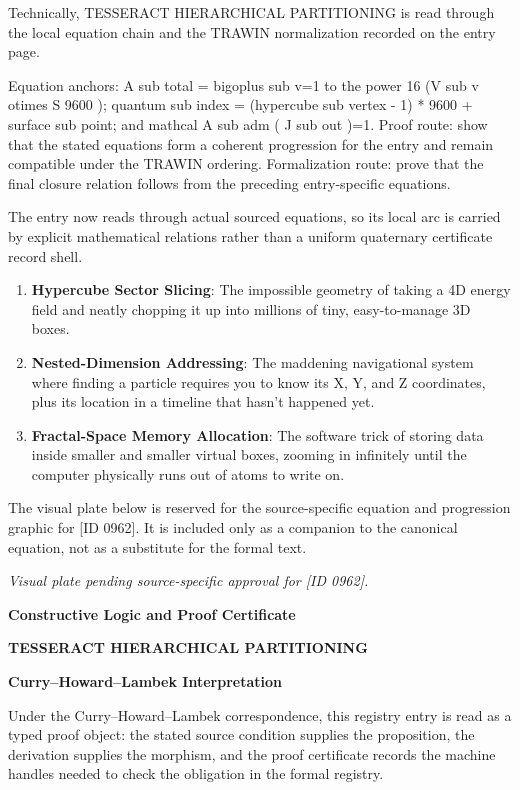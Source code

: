 Technically, TESSERACT HIERARCHICAL PARTITIONING is read through the local equation chain and the TRAWIN normalization recorded on the entry page.

Equation anchors: A sub total = bigoplus sub v=1 to the power 16 (V sub v otimes S 9600 ); quantum sub index = (hypercube sub vertex - 1) * 9600 + surface sub point; and mathcal A sub adm ( J sub out )=1. Proof route: show that the stated equations form a coherent progression for the entry and remain compatible under the TRAWIN ordering. Formalization route: prove that the final closure relation follows from the preceding entry-specific equations.

The entry now reads through actual sourced equations, so its local arc is carried by explicit mathematical relations rather than a uniform quaternary certificate record shell.
\endgroup

\begin{enumerate}[leftmargin=1.6em,itemsep=6pt,topsep=4pt]
\item \textbf{Hypercube Sector Slicing}: The impossible geometry of taking a 4D energy field and neatly chopping it up into millions of tiny, easy-to-manage 3D boxes.
\item \textbf{Nested-Dimension Addressing}: The maddening navigational system where finding a particle requires you to know its X, Y, and Z coordinates, plus its location in a timeline that hasn't happened yet.
\item \textbf{Fractal-Space Memory Allocation}: The software trick of storing data inside smaller and smaller virtual boxes, zooming in infinitely until the computer physically runs out of atoms to write on.
\end{enumerate}

\begingroup\footnotesize\sloppy
The visual plate below is reserved for the source-specific equation and progression graphic for [ID 0962]. It is included only as a companion to the canonical equation, not as a substitute for the formal text.
\par\endgroup
\begingroup\footnotesize\itshape
Visual plate pending source-specific approval for [ID 0962].
\par\endgroup

\clearpage
\begingroup\tzpsupportsetup
\noindent\textbf{\fontsize{10.8pt}{12.8pt}\selectfont [ID 0962] Constructive Logic and Proof Certificate}\par
\noindent\textbf{\fontsize{10pt}{12pt}\selectfont TESSERACT HIERARCHICAL PARTITIONING}\par
\vspace{0.45em}
\begingroup
\footnotesize
\setlength{\parskip}{0.22em}
\setlength{\parindent}{0pt}
\noindent\textbf{Curry--Howard--Lambek Interpretation}\par
Under the Curry--Howard--Lambek correspondence, this registry entry is read as a typed proof
object: the stated source condition supplies the proposition, the derivation supplies the
morphism, and the proof certificate records the machine handles needed to check the obligation
in the formal registry.

